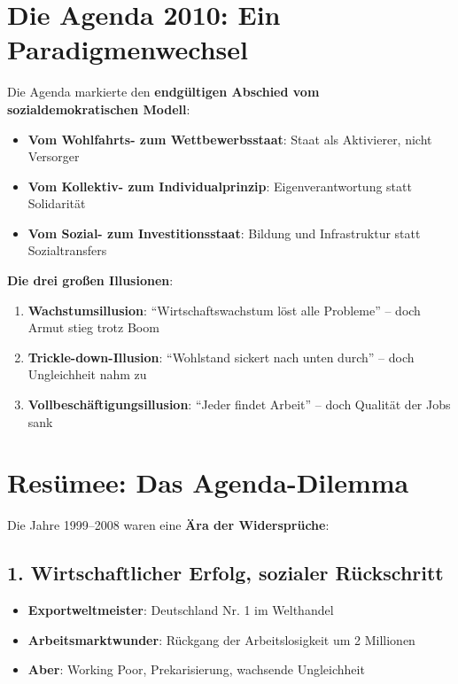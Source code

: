 \section{Die Agenda 2010: Ein Paradigmenwechsel}

Die Agenda markierte den \textbf{endgültigen Abschied vom sozialdemokratischen Modell}:

\begin{itemize}
    \item \textbf{Vom Wohlfahrts- zum Wettbewerbsstaat}: Staat als Aktivierer, nicht Versorger
    \item \textbf{Vom Kollektiv- zum Individualprinzip}: Eigenverantwortung statt Solidarität
    \item \textbf{Vom Sozial- zum Investitionsstaat}: Bildung und Infrastruktur statt Sozialtransfers
\end{itemize}

\textbf{Die drei großen Illusionen}:

\begin{enumerate}
    \item \textbf{Wachstumsillusion}: \enquote{Wirtschaftswachstum löst alle Probleme} – doch Armut stieg trotz Boom
    \item \textbf{Trickle-down-Illusion}: \enquote{Wohlstand sickert nach unten durch} – doch Ungleichheit nahm zu
    \item \textbf{Vollbeschäftigungsillusion}: \enquote{Jeder findet Arbeit} – doch Qualität der Jobs sank
\end{enumerate}

\section{Resümee: Das Agenda-Dilemma}

Die Jahre 1999–2008 waren eine \textbf{Ära der Widersprüche}:

\subsection{1. Wirtschaftlicher Erfolg, sozialer Rückschritt}

\begin{itemize}
    \item \textbf{Exportweltmeister}: Deutschland Nr. 1 im Welthandel
    \item \textbf{Arbeitsmarktwunder}: Rückgang der Arbeitslosigkeit um 2 Millionen
    \item \textbf{Aber}: Working Poor, Prekarisierung, wachsende Ungleichheit
\end{itemize}

